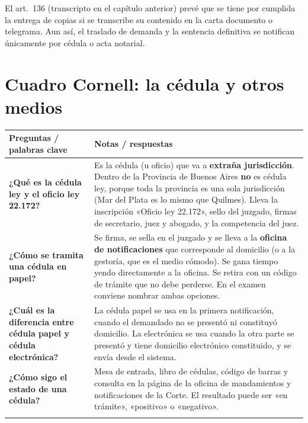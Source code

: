 \documentclass[12pt,oneside]{book}
\begin{document}
\begin{note}
El art.\ 136 (transcripto en el capítulo anterior) prevé que se tiene por cumplida la entrega de copias si se transcribe su contenido en la carta documento o telegrama. Aun así, el traslado de demanda y la sentencia definitiva se notifican únicamente por cédula o acta notarial.
\end{note}

\section{Cuadro Cornell: la cédula y otros medios}

\begin{longtable}{L{0.27\textwidth} L{0.67\textwidth}}
\toprule
\textbf{Preguntas / palabras clave} & \textbf{Notas / respuestas} \\
\midrule
\endhead

\textbf{¿Qué es la cédula ley y el oficio ley 22.172?} &
Es la cédula (u oficio) que va a \textbf{extraña jurisdicción}. Dentro de la Provincia de Buenos Aires \textbf{no} es cédula ley, porque toda la provincia es una sola jurisdicción (Mar del Plata es lo mismo que Quilmes). Lleva la inscripción «Oficio ley 22.172», sello del juzgado, firmas de secretario, juez y abogado, y la competencia del juez. \\
\addlinespace

\textbf{¿Cómo se tramita una cédula en papel?} &
Se firma, se sella en el juzgado y se lleva a la \textbf{oficina de notificaciones} que corresponde al domicilio (o a la gestoría, que es el medio cómodo). Se gana tiempo yendo directamente a la oficina. Se retira con un código de trámite que no debe perderse. En el examen conviene nombrar ambas opciones. \\
\addlinespace

\textbf{¿Cuál es la diferencia entre cédula papel y cédula electrónica?} &
La cédula papel se usa en la primera notificación, cuando el demandado no se presentó ni constituyó domicilio. La electrónica se usa cuando la otra parte se presentó y tiene domicilio electrónico constituido, y se envía desde el sistema. \\
\addlinespace

\textbf{¿Cómo sigo el estado de una cédula?} &
Mesa de entrada, libro de cédulas, código de barras y consulta en la página de la oficina de mandamientos y notificaciones de la Corte. El resultado puede ser «en trámite», «positivo» o «negativo». \\
\addlinespace


\end{longtable}
\end{document}
